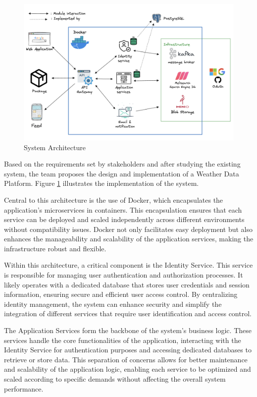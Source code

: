 \begin{figure}[H]
    \centering
    \includegraphics[width=\linewidth]{Images/arch.png}
    \vspace{1em}
    \caption{System Architecture}
    \label{fig:sow}
\end{figure}
\vspace{0.5cm}
Based on the requirements set by stakeholders and after studying the existing
system, the team proposes the design and implementation of a Weather Data
Platform. Figure \ref{fig:sow} illustrates the implementation of the system.

Central to this architecture is the use of Docker, which encapsulates the
application's microservices in containers. This encapsulation ensures that each
service can be deployed and scaled independently across different environments
without compatibility issues. Docker not only facilitates easy deployment but
also enhances the manageability and scalability of the application services,
making the infrastructure robust and flexible.

Within this architecture, a critical component is the Identity Service. This
service is responsible for managing user authentication and authorization
processes. It likely operates with a dedicated database that stores user
credentials and session information, ensuring secure and efficient user access
control. By centralizing identity management, the system can enhance security
and simplify the integration of different services that require user
identification and access control.

The Application Services form the backbone of the system's business logic. These
services handle the core functionalities of the application, interacting with
the Identity Service for authentication purposes and accessing dedicated
databases to retrieve or store data. This separation of concerns allows for
better maintenance and scalability of the application logic, enabling each
service to be optimized and scaled according to specific demands without
affecting the overall system performance.

